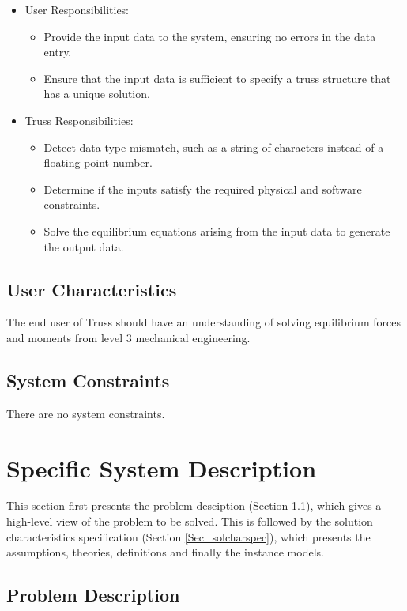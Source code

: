 \documentclass[12pt]{article}
\begin{document}
\begin{itemize}
\item User Responsibilities:
\begin{itemize}
\item Provide the input data to the system, ensuring no errors in the data 
entry.
\item Ensure that the input data is sufficient to specify a truss structure 
that has a unique solution.
\end{itemize}
\item Truss Responsibilities:
\begin{itemize}
\item Detect data type mismatch, such as a string of characters instead of a
  floating point number.
\item Determine if the inputs satisfy the required physical and software 
constraints.
\item Solve the equilibrium equations arising from the input data to generate 
the output data.
\end{itemize}
\end{itemize}

\subsection{User Characteristics} \label{SecUserCharacteristics}
The end user of Truss should have an understanding of solving equilibrium 
forces and moments from level 3 mechanical engineering.

\subsection{System Constraints}
There are no system constraints.

\section{Specific System Description}

This section first presents the problem desciption (Section \ref{Sec_pd}), 
which gives a high-level view of the problem to be solved.  This is followed by 
the solution characteristics specification (Section \ref{Sec_solcharspec}), 
which presents the assumptions, theories, definitions and finally the instance 
models.  

\subsection{Problem Description} \label{Sec_pd}
\end{document}
